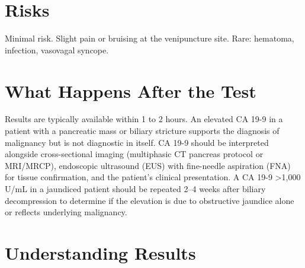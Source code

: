 \section*{Risks}
Minimal risk. Slight pain or bruising at the venipuncture site. Rare: hematoma, infection, vasovagal syncope.

\section*{What Happens After the Test}
Results are typically available within 1 to 2 hours. An elevated CA 19-9 in a patient with a pancreatic mass or biliary stricture supports the diagnosis of malignancy but is not diagnostic in itself. CA 19-9 should be interpreted alongside cross-sectional imaging (multiphasic CT pancreas protocol or MRI/MRCP), endoscopic ultrasound (EUS) with fine-needle aspiration (FNA) for tissue confirmation, and the patient's clinical presentation. A CA 19-9 >1,000 U/mL in a jaundiced patient should be repeated 2--4 weeks after biliary decompression to determine if the elevation is due to obstructive jaundice alone or reflects underlying malignancy.

\section*{Understanding Results}

